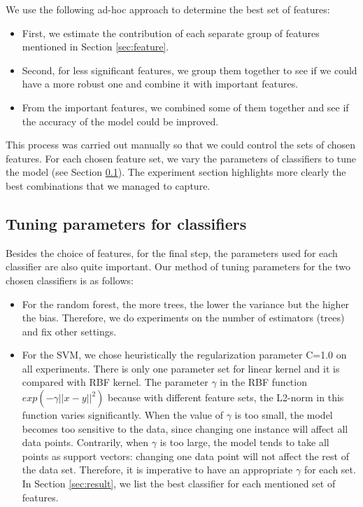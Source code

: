 \documentclass{article}
\begin{document}
We use the following ad-hoc approach to determine the best set of features:
\begin{itemize}
\item First, we estimate the contribution of each separate group of features mentioned in Section \ref{sec:feature}.
\item Second, for less significant features, we group them together to see if we could have a more robust one and combine it with important features.
\item From the important features, we combined some of them together and see if the accuracy of the model could be improved.
\end{itemize}
This process was carried out manually so that we could control the sets of chosen features. For each chosen feature set, we vary the parameters of classifiers to tune the model (see Section \ref{sec:tuning}). The experiment section highlights more clearly the best combinations that we managed to capture.

\subsection{Tuning parameters for classifiers}
\label{sec:tuning}
Besides the choice of features, for the final step, the parameters used for each classifier are also quite important. Our method of tuning parameters for the two chosen classifiers is as follows:
\begin{itemize}
\item For the random forest, the more trees, the lower the variance but the higher the bias. Therefore, we do experiments on the number of estimators (trees) and fix other settings.
\item For the SVM, we chose heuristically the regularization parameter C=1.0 on all experiments. There is only one parameter set for linear kernel and it is compared with RBF kernel. The parameter $\gamma$ in the RBF function $exp(-\gamma||x-y||^2)$ because with different feature sets, the L2-norm in this function varies significantly. When the value of $\gamma$ is too small, the model becomes too sensitive to the data, since changing one instance will affect all data points. Contrarily, when $\gamma$ is too large, the model tends to take all points as support vectors: changing one data point will not affect the rest of the data set. Therefore, it is imperative to have an appropriate $\gamma$ for each set. In Section \ref{sec:result}, we list the best classifier for each mentioned set of features.
\end{itemize}
\end{document}
